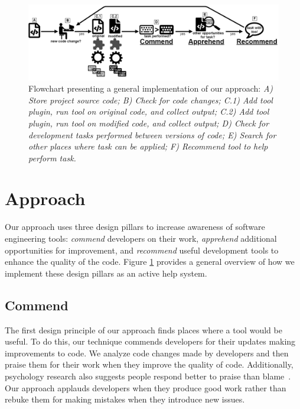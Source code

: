 \documentclass[sigconf,review,anonymous]{acmart}
\begin{document}
\begin{figure}
	\includegraphics[width=\textwidth]{images/flowchartA.png}
	\caption{Flowchart presenting a general implementation of our approach: \textit{A) Store project source code; B) Check for code changes; C.1) Add tool plugin, run tool on original code, and collect output; C.2) Add tool plugin, run tool on modified code, and collect output; D) Check for development tasks performed between versions of code; E) Search for other places where task can be applied; F) Recommend tool to help perform task.}}	
	\label{fig:chartA} 
\end{figure}

\section{Approach}

Our approach uses three design pillars to increase awareness of software engineering tools: \textit{commend} developers on their work, \textit{apprehend} additional opportunities for improvement, and \textit{recommend} useful development tools to enhance the quality of the code. Figure \ref{fig:chartA} provides a general overview of how we implement these design pillars as an active help system.

\subsection{Commend}

The first design principle of our approach finds places where a tool would be useful. To do this, our technique commends developers for their updates making improvements to code. We analyze code changes made by developers and then praise them for their work when they improve the quality of code. Additionally, psychology research also suggests people respond better to praise than blame~\cite{PraiseAndBlame}. Our approach applauds developers when they produce good work rather than rebuke them for making mistakes when they introduce new issues. 
\end{document}
